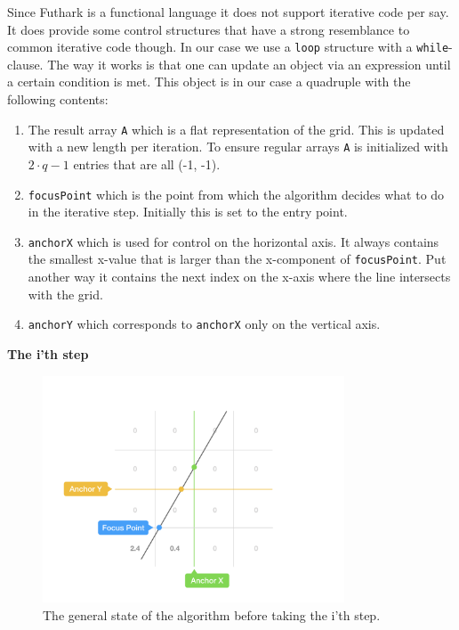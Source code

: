 Since Futhark is a functional language it does not support iterative code per say. It does provide some control structures that have a strong resemblance to common iterative code though. In our case we use a \texttt{loop} structure with a \texttt{while}-clause. The way it works is that one can update an object via an expression until a certain condition is met. This object is in our case a quadruple with the following contents:
\begin{enumerate}
  \item The result array \texttt{A} which is a flat representation of the grid. This is updated with a new length per iteration. To ensure regular arrays \texttt{A} is initialized with $2 \cdot q - 1$ entries that are all (-1, -1).
  \item\texttt{focusPoint} which is the point from which the algorithm decides what to do in the iterative step. Initially this is set to the entry point.
  \item\texttt{anchorX} which is used for control on the horizontal axis. It always contains the smallest x-value that is larger than the x-component of \texttt{focusPoint}. Put another way it contains the next index on the x-axis where the line intersects with the grid.
  \item\texttt{anchorY} which corresponds to \texttt{anchorX} only on the vertical axis.
\end{enumerate}
\textbf{The i'th step}
\begin{figure}[H] 
  \centering
  \includegraphics[width=0.8\textwidth]{figures/alg_step_before.png}
  \caption{The general state of the algorithm before taking the i'th step.}
  \label{fig:alg_step_before}
\end{figure}

